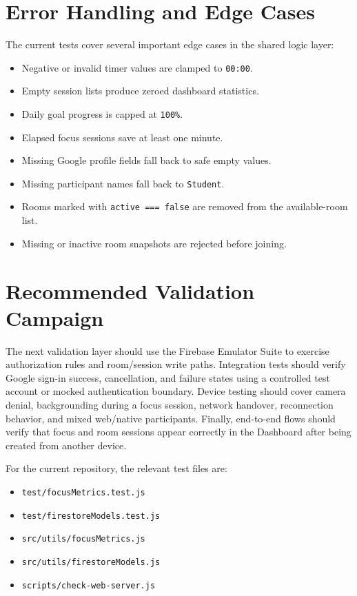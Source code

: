 \section{Error Handling and Edge Cases}
The current tests cover several important edge cases in the shared logic layer:

\begin{itemize}
  \item Negative or invalid timer values are clamped to \texttt{00:00}.
  \item Empty session lists produce zeroed dashboard statistics.
  \item Daily goal progress is capped at \texttt{100\%}.
  \item Elapsed focus sessions save at least one minute.
  \item Missing Google profile fields fall back to safe empty values.
  \item Missing participant names fall back to \texttt{Student}.
  \item Rooms marked with \texttt{active === false} are removed from the available-room list.
  \item Missing or inactive room snapshots are rejected before joining.
\end{itemize}

\section{Recommended Validation Campaign}
The next validation layer should use the Firebase Emulator Suite to exercise authorization rules and room/session write paths. Integration tests should verify Google sign-in success, cancellation, and failure states using a controlled test account or mocked authentication boundary. Device testing should cover camera denial, backgrounding during a focus session, network handover, reconnection behavior, and mixed web/native participants. Finally, end-to-end flows should verify that focus and room sessions appear correctly in the Dashboard after being created from another device.

For the current repository, the relevant test files are:

\begin{itemize}
  \item \texttt{test/focusMetrics.test.js}
  \item \texttt{test/firestoreModels.test.js}
  \item \texttt{src/utils/focusMetrics.js}
  \item \texttt{src/utils/firestoreModels.js}
  \item \texttt{scripts/check-web-server.js}
\end{itemize}
